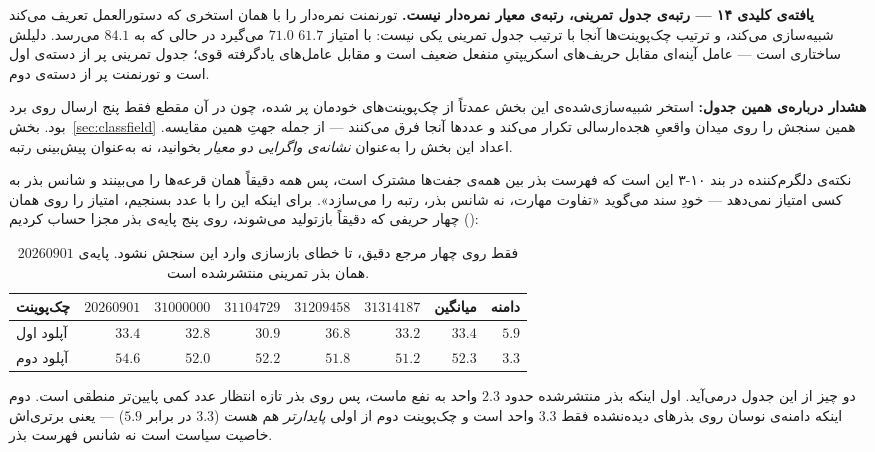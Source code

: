 \documentclass[12pt,a4paper]{article}
\begin{document}
\begin{findbox}
\textbf{یافته‌ی کلیدی ۱۴ — رتبه‌ی جدول تمرینی، رتبه‌ی معیار نمره‌دار
نیست.}
 تورنمنت نمره‌دار را با همان استخری که
دستورالعمل تعریف می‌کند شبیه‌سازی می‌کند، و ترتیب چک‌پوینت‌ها آنجا با
ترتیب جدول تمرینی یکی نیست:  با امتیاز $61.7$
$71.0$ می‌گیرد در حالی که  به $84.1$ می‌رسد. دلیلش
ساختاری است — عامل آینه‌ای مقابل حریف‌های اسکریپتیِ منفعل ضعیف است و
مقابل عامل‌های یادگرفته قوی؛ جدول تمرینی پر از دسته‌ی اول است و تورنمنت
پر از دسته‌ی دوم.

\textbf{هشدار درباره‌ی همین جدول:} استخر شبیه‌سازی‌شده‌ی این بخش
عمدتاً از چک‌پوینت‌های خودمان پر شده، چون در آن مقطع فقط پنج
ارسال روی برد بود. بخش~\ref{sec:classfield} همین سنجش را روی میدان
واقعیِ هجده‌ارسالی تکرار می‌کند و عددها آنجا فرق می‌کنند — از جمله
جهتِ همین مقایسه. اعداد این بخش را به‌عنوان \emph{نشانه‌ی واگرایی دو
معیار} بخوانید، نه به‌عنوان پیش‌بینی رتبه.
\end{findbox}

نکته‌ی دلگرم‌کننده در بند ۱۰-۳ این است که فهرست بذر بین همه‌ی جفت‌ها
مشترک است، پس همه دقیقاً همان قرعه‌ها را می‌بینند و شانس بذر به کسی
امتیاز نمی‌دهد — خودِ سند می‌گوید «تفاوت مهارت، نه شانس بذر، رتبه را
می‌سازد». برای اینکه این را با عدد بسنجیم، امتیاز را روی همان چهار
حریفی که دقیقاً بازتولید می‌شوند، روی پنج پایه‌ی بذر مجزا حساب کردیم
():

\begin{table}[h]\centering\small
\begin{tabular}{lrrrrrrr}
\toprule
چک‌پوینت & $20260901$ & $31000000$ & $31104729$ & $31209458$ & $31314187$
         & میانگین & دامنه\\
\midrule
آپلود اول  & $33.4$ & $32.8$ & $30.9$ & $36.8$ & $33.2$ & $33.4$ & $5.9$\\
آپلود دوم  & $\mathbf{54.6}$ & $52.0$ & $52.2$ & $51.8$ & $51.2$
           & $\mathbf{52.3}$ & $\mathbf{3.3}$\\
\bottomrule
\end{tabular}
\caption{فقط روی چهار مرجع دقیق، تا خطای بازسازی وارد این سنجش نشود.
پایه‌ی $20260901$ همان بذر تمرینی منتشرشده است.}
\end{table}

دو چیز از این جدول درمی‌آید. اول اینکه بذر منتشرشده حدود $2.3$ واحد به
نفع ماست، پس روی بذر تازه انتظار عدد کمی پایین‌تر منطقی است. دوم اینکه
دامنه‌ی نوسان روی بذرهای دیده‌نشده فقط $3.3$ واحد است و چک‌پوینت دوم از
اولی \emph{پایدارتر} هم هست ($3.3$ در برابر $5.9$) — یعنی برتری‌اش خاصیت
سیاست است نه شانس فهرست بذر.
\end{document}
